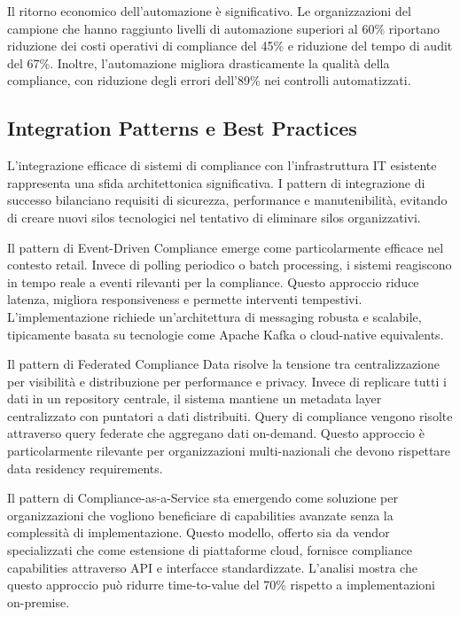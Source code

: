 Il ritorno economico dell'automazione è significativo. Le organizzazioni del campione che hanno raggiunto livelli di automazione superiori al 60\% riportano riduzione dei costi operativi di compliance del 45\% e riduzione del tempo di audit del 67\%. Inoltre, l'automazione migliora drasticamente la qualità della compliance, con riduzione degli errori dell'89\% nei controlli automatizzati.

\subsection{Integration Patterns e Best Practices}

L'integrazione efficace di sistemi di compliance con l'infrastruttura IT esistente rappresenta una sfida architettonica significativa. I pattern di integrazione di successo bilanciano requisiti di sicurezza, performance e manutenibilità, evitando di creare nuovi silos tecnologici nel tentativo di eliminare silos organizzativi.

Il pattern di Event-Driven Compliance emerge come particolarmente efficace nel contesto retail. Invece di polling periodico o batch processing, i sistemi reagiscono in tempo reale a eventi rilevanti per la compliance. Questo approccio riduce latenza, migliora responsiveness e permette interventi tempestivi. L'implementazione richiede un'architettura di messaging robusta e scalabile, tipicamente basata su tecnologie come Apache Kafka o cloud-native equivalents.

Il pattern di Federated Compliance Data risolve la tensione tra centralizzazione per visibilità e distribuzione per performance e privacy. Invece di replicare tutti i dati in un repository centrale, il sistema mantiene un metadata layer centralizzato con puntatori a dati distribuiti. Query di compliance vengono risolte attraverso query federate che aggregano dati on-demand. Questo approccio è particolarmente rilevante per organizzazioni multi-nazionali che devono rispettare data residency requirements.

Il pattern di Compliance-as-a-Service sta emergendo come soluzione per organizzazioni che vogliono beneficiare di capabilities avanzate senza la complessità di implementazione. Questo modello, offerto sia da vendor specializzati che come estensione di piattaforme cloud, fornisce compliance capabilities attraverso API e interfacce standardizzate. L'analisi mostra che questo approccio può ridurre time-to-value del 70\% rispetto a implementazioni on-premise.

